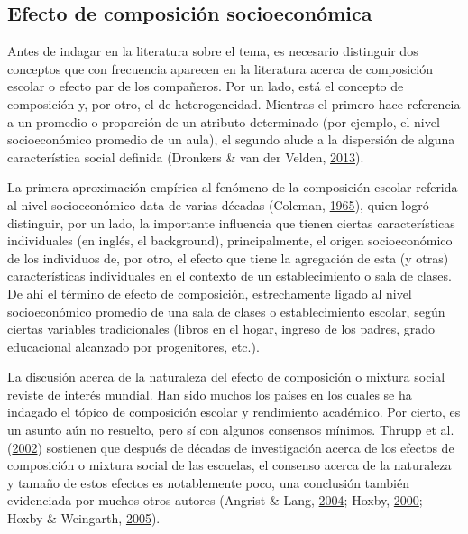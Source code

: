 \documentclass[
]{article}
\begin{document}
\hypertarget{efecto-de-composiciuxf3n-socioeconuxf3mica}{%
\subsection{Efecto de composición
socioeconómica}\label{efecto-de-composiciuxf3n-socioeconuxf3mica}}

Antes de indagar en la literatura sobre el tema, es necesario distinguir
dos conceptos que con frecuencia aparecen en la literatura acerca de
composición escolar o efecto par de los compañeros. Por un lado, está el
concepto de composición y, por otro, el de heterogeneidad. Mientras el
primero hace referencia a un promedio o proporción de un atributo
determinado (por ejemplo, el nivel socioeconómico promedio de un aula),
el segundo alude a la dispersión de alguna característica social
definida (Dronkers \& van der Velden,
\protect\hyperlink{ref-dronkers_positive_2013a}{2013}).

La primera aproximación empírica al fenómeno de la composición escolar
referida al nivel socioeconómico data de varias décadas (Coleman,
\protect\hyperlink{ref-coleman_equality_1965}{1965}), quien logró
distinguir, por un lado, la importante influencia que tienen ciertas
características individuales (en inglés, el background), principalmente,
el origen socioeconómico de los individuos de, por otro, el efecto que
tiene la agregación de esta (y otras) características individuales en el
contexto de un establecimiento o sala de clases. De ahí el término de
efecto de composición, estrechamente ligado al nivel socioeconómico
promedio de una sala de clases o establecimiento escolar, según ciertas
variables tradicionales (libros en el hogar, ingreso de los padres,
grado educacional alcanzado por progenitores, etc.).

La discusión acerca de la naturaleza del efecto de composición o mixtura
social reviste de interés mundial. Han sido muchos los países en los
cuales se ha indagado el tópico de composición escolar y rendimiento
académico. Por cierto, es un asunto aún no resuelto, pero sí con algunos
consensos mínimos. Thrupp et al.
(\protect\hyperlink{ref-thrupp_school_2002b}{2002}) sostienen que
después de décadas de investigación acerca de los efectos de composición
o mixtura social de las escuelas, el consenso acerca de la naturaleza y
tamaño de estos efectos es notablemente poco, una conclusión también
evidenciada por muchos otros autores (Angrist \& Lang,
\protect\hyperlink{ref-angrist_does_2004}{2004}; Hoxby,
\protect\hyperlink{ref-hoxby_peer_2000}{2000}; Hoxby \& Weingarth,
\protect\hyperlink{ref-hoxby_taking_2005}{2005}).
\end{document}
